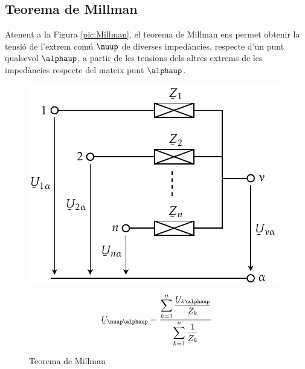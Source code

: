 \subsection{Teorema de Millman}

Atenent a la Figura \vref{pic:Millman}, el teorema
de Millman ens permet
obtenir la tensi\'{o} de l'extrem com\'{u} $\nuup$ de diverses imped\`{a}ncies, respecte d'un punt
qualsevol $\alphaup$, a partir de les tensions dels altres extrems de les imped\`{a}ncies respecte
 del mateix punt $\alphaup$.

\begin{figure}[htb]
\hfill
\begin{minipage}[b]{7cm}
    \includegraphics{Imatges/Cap-Fonaments-Millman.pdf}
    \caption{Teorema de Millman} \label{pic:Millman}
\end{minipage}
\hfill
\begin{minipage}[b][4.5cm][t]{6cm}
    \begin{equation}
        \cmplx{U}_{\nuup\alphaup} = \frac{\displaystyle\sum_{k=1}^n \dfrac{\cmplx{U}_{k\alphaup}}{\cmplx{Z}_k}} {\displaystyle\sum_{k=1}^n \dfrac{1}{\cmplx{Z}_k}}
    \end{equation}
\end{minipage}
\end{figure}

